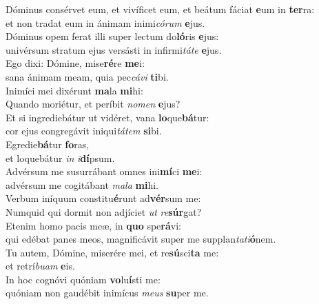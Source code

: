 \evenverse Dóminus consérvet eum, et vivíficet eum, et beátum fáciat \textbf{e}um in \textbf{ter}ra:~\*\\
\evenverse et non tradat eum in ánimam inimi\textit{có}\textit{rum} \textbf{e}jus.\\
\oddverse Dóminus opem ferat illi super lectum do\textbf{ló}ris \textbf{e}jus:~\*\\
\oddverse univérsum stratum ejus versásti in infirmi\textit{tá}\textit{te} \textbf{e}jus.\\
\evenverse Ego dixi: Dómine, mise\textbf{ré}re \textbf{me}i:~\*\\
\evenverse sana ánimam meam, quia pec\textit{cá}\textit{vi} \textbf{ti}bi.\\
\oddverse Inimíci mei dixérunt \textbf{ma}la \textbf{mi}hi:~\*\\
\oddverse Quando moriétur, et períbit \textit{no}\textit{men} \textbf{e}jus?\\
\evenverse Et si ingrediebátur ut vidéret, vana \textbf{lo}que\textbf{bá}tur:~\*\\
\evenverse cor ejus congregávit iniqui\textit{tá}\textit{tem} \textbf{si}bi.\\
\oddverse Egredie\textbf{bá}tur \textbf{fo}ras,~\*\\
\oddverse et loquebátur \textit{in} \textit{i}\textbf{dí}psum.\\
\evenverse Advérsum me susurrábant omnes ini\textbf{mí}ci \textbf{me}i:~\*\\
\evenverse advérsum me cogitábant \textit{ma}\textit{la} \textbf{mi}hi.\\
\oddverse Verbum iníquum constitu\textbf{é}runt ad\textbf{vér}sum me:~\*\\
\oddverse Numquid qui dormit non adjíciet \textit{ut} \textit{re}\textbf{súr}gat?\\
\evenverse Etenim homo pacis meæ, in \textbf{quo} spe\textbf{rá}vi:~\*\\
\evenverse qui edébat panes meos, magnificávit super me supplan\textit{ta}\textit{ti}\textbf{ó}nem.\\
\oddverse Tu autem, Dómine, miserére mei, et re\textbf{sú}sci\textbf{ta} me:~\*\\
\oddverse et retrí\textit{bu}\textit{am} \textbf{e}is.\\
\evenverse In hoc cognóvi quóniam \textbf{vo}lu\textbf{í}sti me:~\*\\
\evenverse quóniam non gaudébit inimícus \textit{me}\textit{us} \textbf{su}per me.\\

